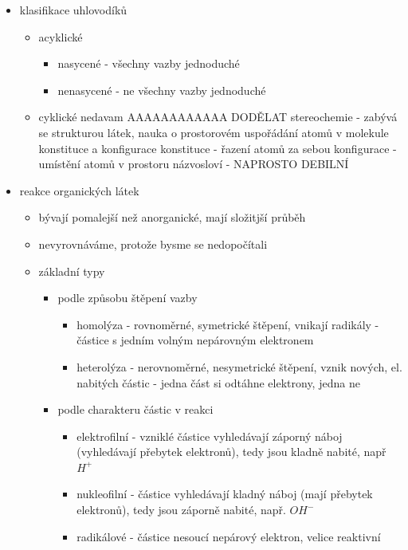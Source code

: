 \documentclass{article}
\begin{document}
\begin{itemize}
\begin{itemize}
  \end{itemize}
  \item klasifikace uhlovodíků
  \begin{itemize}
    \item acyklické
    \begin{itemize}
      \item nasycené - všechny vazby jednoduché
      \item nenasycené - ne všechny vazby jednoduché
    \end{itemize}
    \item cyklické
    nedavam AAAAAAAAAAAA DODĚLAT
    stereochemie - zabývá se strukturou látek, nauka o prostorovém uspořádání atomů v molekule
    konstituce a konfigurace
      konstituce - řazení atomů za sebou
      konfigurace - umístění atomů v prostoru
    názvosloví - NAPROSTO DEBILNÍ
  \end{itemize}
  \item reakce organických látek
  \begin{itemize}
    \item bývají pomalejší než anorganické, mají složitjší průběh
    \item nevyrovnáváme, protože bysme se nedopočítali
    \item základní typy
    \begin{itemize}
      \item podle způsobu štěpení vazby
      \begin{itemize}
        \item homolýza - rovnoměrné, symetrické štěpení, vnikají radikály - částice s jedním volným nepárovným elektronem
        \item heterolýza - nerovnoměrné, nesymetrické štěpení, vznik nových, el. nabitých částic - jedna část si odtáhne elektrony, jedna ne
      \end{itemize}
      \item podle charakteru částic v reakci
      \begin{itemize}
        \item elektrofilní - vzniklé částice vyhledávají záporný náboj (vyhledávají přebytek elektronů), tedy jsou kladně nabité, např $H^+$
        \item nukleofilní - částice vyhledávají kladný náboj (mají přebytek elektronů), tedy jsou záporně nabité, např. $OH^-$
        \item radikálové - částice nesoucí nepárový elektron, velice reaktivní
      \end{itemize}

\end{itemize}
\end{itemize}
\end{itemize}
\end{document}
